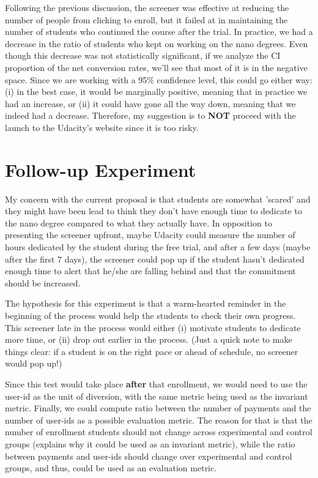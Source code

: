 \documentclass[11pt]{article}
\begin{document}
		Following the previous discussion, the screener was effective at reducing the number of people from clicking to enroll, but it failed at in maintaining the number of students who continued the course after the trial.
		In practice, we had a decrease in the ratio of students who kept on working on the nano degrees.
		Even though this decrease was not statistically significant, if we analyze the CI proportion of the net conversion rates, we'll see that most of it is in the negative space.
		Since we are working with a 95\% confidence level, this could go either way: (i) in the best case, it would be marginally positive, meaning that in practice we had an increase, or (ii) it could have gone all the way down, meaning that we indeed had a decrease.
		Therefore, my suggestion is to \textbf{NOT} proceed with the launch to the Udacity’s website since it is too risky.
				

\section{Follow-up Experiment} \label{sec:followUpExperiments}

	My concern with the current proposal is that students are somewhat 'scared' and they might have been lead to think they don't have enough time to dedicate to the nano degree compared to what they actually have.
	In opposition to presenting the screener upfront, maybe Udacity could measure the number of hours dedicated by the student during the free trial, and after a few days (maybe after the first 7 days), the screener could pop up if the student hasn't dedicated enough time to alert that he/she are falling behind and that the commitment should be increased.
	
	The hypothesis for this experiment is that a warm-hearted reminder in the beginning of the process would help the students to check their own progress.
	This screener late in the process would either (i) motivate students to dedicate more time, or (ii) drop out earlier in the process.
	(Just a quick note to make things clear: if a student is on the right pace or ahead of schedule, no screener would pop up!)
	
	Since this test would take place \textbf{after} that enrollment, we would need to use the user-id as the unit of diversion, with the same metric being used as the invariant metric.
	Finally, we could compute ratio between the number of payments and the number of user-ids as a possible evaluation metric.
	The reason for that is that the number of enrollment students should not change across experimental and control groups (explains why it could be used as an invariant metric), while the ratio between payments and user-ids should change over experimental and control groups, and thus, could be used as an evaluation metric.
	
\end{document}
